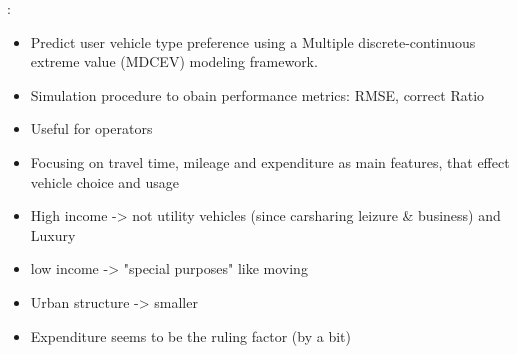 \cite{JIAN2017362}:
\begin{itemize}
    \item Predict user vehicle type preference using a Multiple discrete-continuous extreme value (MDCEV) modeling framework. 
    \item Simulation procedure to obain performance metrics: RMSE, correct Ratio
    \item Useful for operators
    \item Focusing on travel time, mileage and expenditure as main features, that effect vehicle choice and usage
    \item High income -> not utility vehicles (since carsharing leizure \& business) and Luxury
    \item low income -> "special purposes" like moving
    \item Urban structure -> smaller
    \item Expenditure seems to be the ruling factor (by a bit)
\end{itemize}



